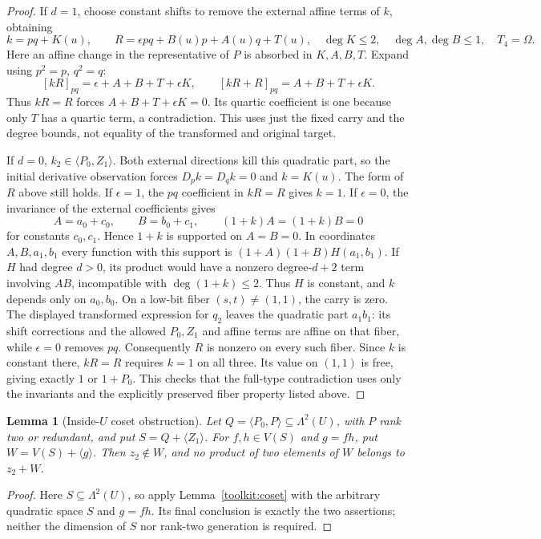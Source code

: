 \documentclass[11pt,a4paper]{article}
\theoremstyle{plain}
\newtheorem{lemma}[theorem]{Lemma}
\theoremstyle{remark}
\begin{document}
\begin{proof}
If $d=1$, choose constant shifts to remove the external affine terms of $k$, obtaining
\[
k=pq+K(u),\qquad R=\epsilon pq+B(u)p+A(u)q+T(u),
\quad \deg K\le2,\quad \deg A,\deg B\le1,\quad T_4=\Omega.
\]
Here an affine change in the representative of $P$ is absorbed in $K,A,B,T$. Expand using $p^2=p$, $q^2=q$:
\[
[kR]_{pq}=\epsilon+A+B+T+\epsilon K,\qquad
[kR+R]_{pq}=A+B+T+\epsilon K.
\]
Thus $kR=R$ forces $A+B+T+\epsilon K=0$. Its quartic coefficient is one because only $T$ has a quartic term, a contradiction. This uses just the fixed carry and the degree bounds, not equality of the transformed and original target.

If $d=0$, $k_2\in\langle P_0,Z_1\rangle$. Both external directions kill this quadratic part, so the initial derivative observation forces $D_pk=D_qk=0$ and $k=K(u)$. The form of $R$ above still holds. If $\epsilon=1$, the $pq$ coefficient in $kR=R$ gives $k=1$. If $\epsilon=0$, the invariance of the external coefficients gives
\[
A=a_0+c_0,\qquad B=b_0+c_1,\qquad
(1+k)A=(1+k)B=0
\]
for constants $c_0,c_1$. Hence $1+k$ is supported on $A=B=0$. In coordinates $A,B,a_1,b_1$ every function with this support is $(1+A)(1+B)H(a_1,b_1)$. If $H$ had degree $d>0$, its product would have a nonzero degree-$d+2$ term involving $AB$, incompatible with $\deg(1+k)\le2$. Thus $H$ is constant, and $k$ depends only on $a_0,b_0$.
On a low-bit fiber $(s,t)\ne(1,1)$, the carry is zero. The displayed transformed expression for $q_2$ leaves the quadratic part $a_1b_1$: its shift corrections and the allowed $P_0,Z_1$ and affine terms are affine on that fiber, while $\epsilon=0$ removes $pq$. Consequently $R$ is nonzero on every such fiber. Since $k$ is constant there, $kR=R$ requires $k=1$ on all three. Its value on $(1,1)$ is free, giving exactly $1$ or $1+P_0$.
This checks that the full-type contradiction uses only the invariants and the explicitly preserved fiber property listed above.
\end{proof}

\begin{lemma}[Inside-$U$ coset obstruction]\label{l2:lem:coset}
Let $Q=\langle P_0,P\rangle\subseteq\Lambda^2(U)$, with $P$ rank two or redundant, and put $S=Q+\langle Z_1\rangle$. For $f,h\in V(S)$ and $g=fh$, put $W=V(S)+\langle g\rangle$. Then $z_2\notin W$, and no product of two elements of $W$ belongs to $z_2+W$.
\end{lemma}
\begin{proof}
Here $S\subseteq\Lambda^2(U)$, so apply Lemma~\ref{toolkit:coset} with the arbitrary quadratic space $S$ and $g=fh$. Its final conclusion is exactly the two assertions; neither the dimension of $S$ nor rank-two generation is required.
\end{proof}
\end{document}
